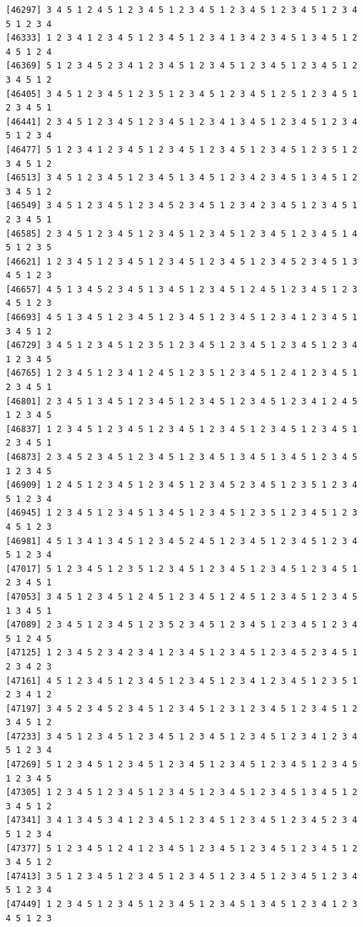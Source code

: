 \documentclass[
  11pt,
]{book}
\begin{document}
\begin{verbatim}
[46297] 3 4 5 1 2 4 5 1 2 3 4 5 1 2 3 4 5 1 2 3 4 5 1 2 3 4 5 1 2 3 4 5 1 2 3 4
[46333] 1 2 3 4 1 2 3 4 5 1 2 3 4 5 1 2 3 4 1 3 4 2 3 4 5 1 3 4 5 1 2 4 5 1 2 4
[46369] 5 1 2 3 4 5 2 3 4 1 2 3 4 5 1 2 3 4 5 1 2 3 4 5 1 2 3 4 5 1 2 3 4 5 1 2
[46405] 3 4 5 1 2 3 4 5 1 2 3 5 1 2 3 4 5 1 2 3 4 5 1 2 5 1 2 3 4 5 1 2 3 4 5 1
[46441] 2 3 4 5 1 2 3 4 5 1 2 3 4 5 1 2 3 4 1 3 4 5 1 2 3 4 5 1 2 3 4 5 1 2 3 4
[46477] 5 1 2 3 4 1 2 3 4 5 1 2 3 4 5 1 2 3 4 5 1 2 3 4 5 1 2 3 5 1 2 3 4 5 1 2
[46513] 3 4 5 1 2 3 4 5 1 2 3 4 5 1 3 4 5 1 2 3 4 2 3 4 5 1 3 4 5 1 2 3 4 5 1 2
[46549] 3 4 5 1 2 3 4 5 1 2 3 4 5 2 3 4 5 1 2 3 4 2 3 4 5 1 2 3 4 5 1 2 3 4 5 1
[46585] 2 3 4 5 1 2 3 4 5 1 2 3 4 5 1 2 3 4 5 1 2 3 4 5 1 2 3 4 5 1 4 5 1 2 3 5
[46621] 1 2 3 4 5 1 2 3 4 5 1 2 3 4 5 1 2 3 4 5 1 2 3 4 5 2 3 4 5 1 3 4 5 1 2 3
[46657] 4 5 1 3 4 5 2 3 4 5 1 3 4 5 1 2 3 4 5 1 2 4 5 1 2 3 4 5 1 2 3 4 5 1 2 3
[46693] 4 5 1 3 4 5 1 2 3 4 5 1 2 3 4 5 1 2 3 4 5 1 2 3 4 1 2 3 4 5 1 3 4 5 1 2
[46729] 3 4 5 1 2 3 4 5 1 2 3 5 1 2 3 4 5 1 2 3 4 5 1 2 3 4 5 1 2 3 4 1 2 3 4 5
[46765] 1 2 3 4 5 1 2 3 4 1 2 4 5 1 2 3 5 1 2 3 4 5 1 2 4 1 2 3 4 5 1 2 3 4 5 1
[46801] 2 3 4 5 1 3 4 5 1 2 3 4 5 1 2 3 4 5 1 2 3 4 5 1 2 3 4 1 2 4 5 1 2 3 4 5
[46837] 1 2 3 4 5 1 2 3 4 5 1 2 3 4 5 1 2 3 4 5 1 2 3 4 5 1 2 3 4 5 1 2 3 4 5 1
[46873] 2 3 4 5 2 3 4 5 1 2 3 4 5 1 2 3 4 5 1 3 4 5 1 3 4 5 1 2 3 4 5 1 2 3 4 5
[46909] 1 2 4 5 1 2 3 4 5 1 2 3 4 5 1 2 3 4 5 2 3 4 5 1 2 3 5 1 2 3 4 5 1 2 3 4
[46945] 1 2 3 4 5 1 2 3 4 5 1 3 4 5 1 2 3 4 5 1 2 3 5 1 2 3 4 5 1 2 3 4 5 1 2 3
[46981] 4 5 1 3 4 1 3 4 5 1 2 3 4 5 2 4 5 1 2 3 4 5 1 2 3 4 5 1 2 3 4 5 1 2 3 4
[47017] 5 1 2 3 4 5 1 2 3 5 1 2 3 4 5 1 2 3 4 5 1 2 3 4 5 1 2 3 4 5 1 2 3 4 5 1
[47053] 3 4 5 1 2 3 4 5 1 2 4 5 1 2 3 4 5 1 2 4 5 1 2 3 4 5 1 2 3 4 5 1 3 4 5 1
[47089] 2 3 4 5 1 2 3 4 5 1 2 3 5 2 3 4 5 1 2 3 4 5 1 2 3 4 5 1 2 3 4 5 1 2 4 5
[47125] 1 2 3 4 5 2 3 4 2 3 4 1 2 3 4 5 1 2 3 4 5 1 2 3 4 5 2 3 4 5 1 2 3 4 2 3
[47161] 4 5 1 2 3 4 5 1 2 3 4 5 1 2 3 4 5 1 2 3 4 1 2 3 4 5 1 2 3 5 1 2 3 4 1 2
[47197] 3 4 5 2 3 4 5 2 3 4 5 1 2 3 4 5 1 2 3 1 2 3 4 5 1 2 3 4 5 1 2 3 4 5 1 2
[47233] 3 4 5 1 2 3 4 5 1 2 3 4 5 1 2 3 4 5 1 2 3 4 5 1 2 3 4 1 2 3 4 5 1 2 3 4
[47269] 5 1 2 3 4 5 1 2 3 4 5 1 2 3 4 5 1 2 3 4 5 1 2 3 4 5 1 2 3 4 5 1 2 3 4 5
[47305] 1 2 3 4 5 1 2 3 4 5 1 2 3 4 5 1 2 3 4 5 1 2 3 4 5 1 3 4 5 1 2 3 4 5 1 2
[47341] 3 4 1 3 4 5 3 4 1 2 3 4 5 1 2 3 4 5 1 2 3 4 5 1 2 3 4 5 2 3 4 5 1 2 3 4
[47377] 5 1 2 3 4 5 1 2 4 1 2 3 4 5 1 2 3 4 5 1 2 3 4 5 1 2 3 4 5 1 2 3 4 5 1 2
[47413] 3 5 1 2 3 4 5 1 2 3 4 5 1 2 3 4 5 1 2 3 4 5 1 2 3 4 5 1 2 3 4 5 1 2 3 4
[47449] 1 2 3 4 5 1 2 3 4 5 1 2 3 4 5 1 2 3 4 5 1 3 4 5 1 2 3 4 1 2 3 4 5 1 2 3

\end{verbatim}
\end{document}
